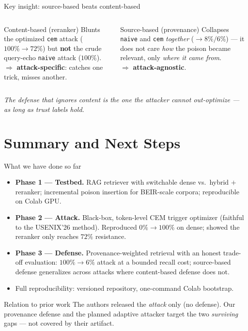 \documentclass[aspectratio=169,11pt]{beamer}
\newcommand{\good}[1]{\textcolor{rbgreen}{\textbf{#1}}}
\newcommand{\bad}[1]{\textcolor{rbaccent}{\textbf{#1}}}
\begin{document}
\begin{frame}{Key insight: source-based beats content-based}
  \begin{columns}[T]
    \begin{block}{Content-based (reranker)}
      \scriptsize
      Blunts the optimized \texttt{cem} attack ($100\%\!\to\!72\%$) but \textbf{not} the crude query-echo \texttt{naive} attack ($100\%$).\\[0.3em]
      $\Rightarrow$ \bad{attack-specific}: catches one trick, misses another.
    \end{block}
    \begin{exampleblock}{Source-based (provenance)}
      \scriptsize
      Collapses \texttt{naive} and \texttt{cem} \emph{together} ($\to 8\%/6\%$) --- it does not care \emph{how} the poison became relevant, only \emph{where it came from}.\\[0.3em]
      $\Rightarrow$ \good{attack-agnostic}.
    \end{exampleblock}
  \end{columns}
  \vspace{0.6em}
  \begin{center}
  \emph{The defense that ignores content is the one the attacker cannot out-optimize --- as long as trust labels hold.}
  \end{center}
\end{frame}

\section{Summary and Next Steps}

\begin{frame}{What we have done so far}
  \small
  \begin{itemize}
    \item \good{Phase 1 --- Testbed.} RAG retriever with switchable dense vs.\ hybrid $+$ reranker; incremental poison insertion for BEIR-scale corpora; reproducible on Colab GPU.
    \item \good{Phase 2 --- Attack.} Black-box, token-level CEM trigger optimizer (faithful to the USENIX'26 method). Reproduced $0\%\!\to\!100\%$ on dense; showed the reranker only reaches $72\%$ resistance.
    \item \good{Phase 3 --- Defense.} Provenance-weighted retrieval with an honest trade-off evaluation: $100\%\!\to\!6\%$ attack at a bounded recall cost; source-based defense generalizes across attacks where content-based defense does not.
    \item Full reproducibility: versioned repository, one-command Colab bootstrap.
  \end{itemize}
  \begin{block}{Relation to prior work}
    \scriptsize The authors released the \emph{attack} only (no defense). Our provenance defense and the planned adaptive attacker target the two \emph{surviving} gaps --- not covered by their artifact.
  \end{block}
\end{frame}
\end{document}
